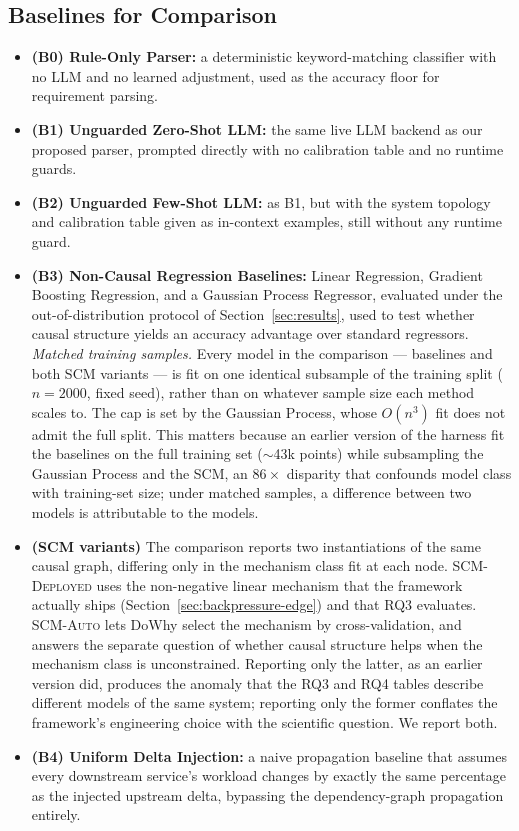 \documentclass[journal, 10pt]{IEEEtran}
\begin{document}
\subsection{Baselines for Comparison}
\begin{itemize}
    \item \textbf{(B0) Rule-Only Parser:} a deterministic keyword-matching classifier with no LLM and no learned adjustment, used as the accuracy floor for requirement parsing.
    \item \textbf{(B1) Unguarded Zero-Shot LLM:} the same live LLM backend as our proposed parser, prompted directly with no calibration table and no runtime guards.
    \item \textbf{(B2) Unguarded Few-Shot LLM:} as B1, but with the system topology and calibration table given as in-context examples, still without any runtime guard.
    \item \textbf{(B3) Non-Causal Regression Baselines:} Linear Regression, Gradient Boosting Regression, and a Gaussian Process Regressor, evaluated under the out-of-distribution protocol of Section~\ref{sec:results}, used to test whether causal structure yields an accuracy advantage over standard regressors. \emph{Matched training samples.} Every model in the comparison --- baselines and both SCM variants --- is fit on one identical subsample of the training split ($n{=}2000$, fixed seed), rather than on whatever sample size each method scales to. The cap is set by the Gaussian Process, whose $O(n^3)$ fit does not admit the full split. This matters because an earlier version of the harness fit the baselines on the full training set ($\sim$43k points) while subsampling the Gaussian Process and the SCM, an $86{\times}$ disparity that confounds model class with training-set size; under matched samples, a difference between two models is attributable to the models.
    \item \textbf{(SCM variants)} The comparison reports two instantiations of the same causal graph, differing only in the mechanism class fit at each node. \textsc{SCM-Deployed} uses the non-negative linear mechanism that the framework actually ships (Section~\ref{sec:backpressure-edge}) and that RQ3 evaluates. \textsc{SCM-Auto} lets DoWhy select the mechanism by cross-validation, and answers the separate question of whether causal structure helps when the mechanism class is unconstrained. Reporting only the latter, as an earlier version did, produces the anomaly that the RQ3 and RQ4 tables describe different models of the same system; reporting only the former conflates the framework's engineering choice with the scientific question. We report both.
    \item \textbf{(B4) Uniform Delta Injection:} a naive propagation baseline that assumes every downstream service's workload changes by exactly the same percentage as the injected upstream delta, bypassing the dependency-graph propagation entirely.
\end{itemize}
\end{document}
